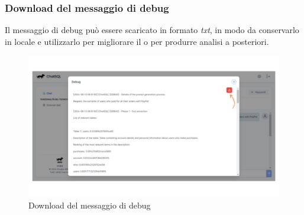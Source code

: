 \subsubsection{Download del messaggio di debug}

Il messaggio di debug può essere scaricato in formato \textit{txt}, in modo da conservarlo in locale e utilizzarlo per migliorare il  o per produrre analisi a posteriori.
\begin{figure}[H]
  \centering
  \includegraphics[width=\textwidth]{assets/tasto_dawnload_debug.png}
  \caption{Download del messaggio di debug}
\end{figure}





